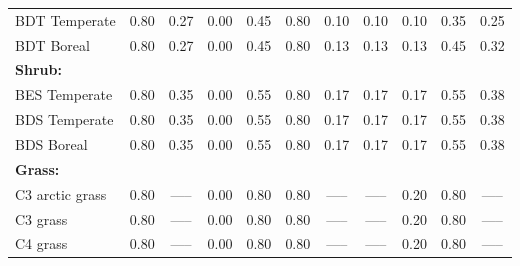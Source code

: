 \begin{landscape}
\begin{table}[htbp]
\begin{tabular}{lcccccccccc}
      BDT Temperate                         & 0.80                 & 0.27                 & 0.00                 & 0.45               & 0.80                & 0.10                      & 0.10                    & 0.10                & 0.35              & 0.25                      \\
      BDT Boreal                            & 0.80                 & 0.27                 & 0.00                 & 0.45               & 0.80                & 0.13                      & 0.13                    & 0.13                & 0.45              & 0.32                      \\ \hline
      \multicolumn{11}{l}{\textbf{Shrub:}} \\
      BES Temperate                         & 0.80                 & 0.35                 & 0.00                 & 0.55               & 0.80                & 0.17                      & 0.17                    & 0.17                & 0.55              & 0.38                      \\
      BDS Temperate                         & 0.80                 & 0.35                 & 0.00                 & 0.55               & 0.80                & 0.17                      & 0.17                    & 0.17                & 0.55              & 0.38                      \\
      BDS Boreal                            & 0.80                 & 0.35                 & 0.00                 & 0.55               & 0.80                & 0.17                      & 0.17                    & 0.17                & 0.55              & 0.38                      \\ \hline
      \multicolumn{11}{l}{\textbf{Grass:}} \\
      C3  arctic grass                      & 0.80                 & -----                & 0.00                 & 0.80               & 0.80                & -----                     & -----                   & 0.20                & 0.80              & -----                     \\
      C3  grass                             & 0.80                 & -----                & 0.00                 & 0.80               & 0.80                & -----                     & -----                   & 0.20                & 0.80              & -----                     \\
      C4  grass                             & 0.80                 & -----                & 0.00                 & 0.80               & 0.80                & -----                     & -----                   & 0.20                & 0.80              & -----                     \\ \hline

\end{tabular}
\end{table}
\end{landscape}
